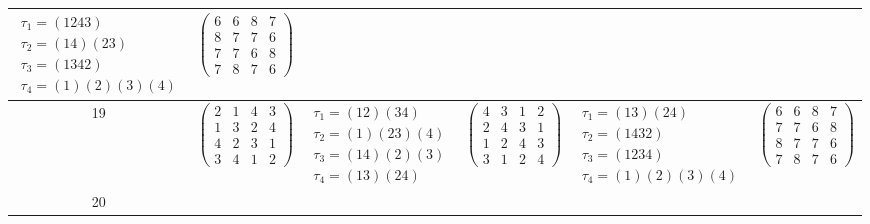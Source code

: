 \begin{longtable}{|c|p{2.7cm}|p{2.7cm}|p{2.7cm}|p{2.7cm}|p{2.7cm}|}
    $\begin{array}{l}\tau_{1}=(1243)\\ \tau_{2}=(14)(23)\\ \tau_{3}=(1342)\\ \tau_{4}=(1)(2)(3)(4)\end{array}$     &
    $\begin{pmatrix} 6 & 6 & 8 & 7 \\ 8 & 7 & 7 & 6 \\ 7 & 7 & 6 & 8 \\ 7 & 8 & 7 & 6 \end{pmatrix}$                                                                                           \\
    \hline
    19                                                                                                             &
    $\begin{pmatrix} 2 & 1 & 4 & 3 \\ 1 & 3 & 2 & 4 \\ 4 & 2 & 3 & 1 \\ 3 & 4 & 1 & 2 \end{pmatrix}$               &
    $\begin{array}{l}\tau_{1}=(12)(34)\\ \tau_{2}=(1)(23)(4)\\ \tau_{3}=(14)(2)(3)\\ \tau_{4}=(13)(24)\end{array}$ &
    $\begin{pmatrix} 4 & 3 & 1 & 2 \\ 2 & 4 & 3 & 1 \\ 1 & 2 & 4 & 3 \\ 3 & 1 & 2 & 4 \end{pmatrix}$               &
    $\begin{array}{l}\tau_{1}=(13)(24)\\ \tau_{2}=(1432)\\ \tau_{3}=(1234)\\ \tau_{4}=(1)(2)(3)(4)\end{array}$     &
    $\begin{pmatrix} 6 & 6 & 8 & 7 \\ 7 & 7 & 6 & 8 \\ 8 & 7 & 7 & 6 \\ 7 & 8 & 7 & 6 \end{pmatrix}$                                                                                           \\
    \hline
    20                                                                                                             &

\end{longtable}
